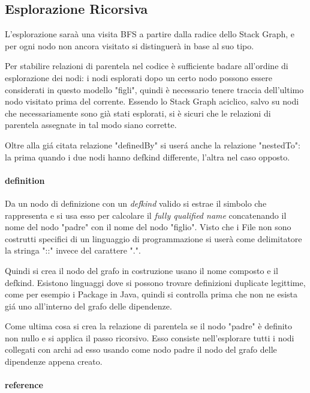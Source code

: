 \subsection{Esplorazione Ricorsiva}

L'esplorazione sara\`a una visita BFS a partire dalla radice dello Stack Graph, e per ogni nodo non ancora visitato si distinguer\`a in base al suo tipo.

Per stabilire relazioni di parentela nel codice \`e sufficiente badare all'ordine di esplorazione dei nodi: i nodi esplorati dopo un certo nodo possono essere considerati in questo modello "figli", quindi \`e necessario tenere traccia dell'ultimo nodo visitato prima del corrente. Essendo lo Stack Graph aciclico, salvo su nodi che necessariamente sono gi\`a stati esplorati, si \`e sicuri che le relazioni di parentela assegnate in tal modo siano corrette.

Oltre alla gi\'a citata relazione "definedBy" si user\'a anche la relazione "nestedTo": la prima quando i due nodi hanno defkind differente, l'altra nel caso opposto.

\paragraph{definition}

Da un nodo di definizione con un \emph{defkind} valido si estrae il simbolo che rappresenta e si usa esso per calcolare il \emph{fully qualified name} concatenando il nome del nodo "padre" con il nome del nodo "figlio". Visto che i File non sono costrutti specifici di un linguaggio di programmazione si user\`a come delimitatore la stringa "::" invece del carattere ".".

Quindi si crea il nodo del grafo in costruzione usano il nome composto e il defkind. Esistono linguaggi dove si possono trovare definizioni duplicate legittime, come per esempio i Package in Java, quindi si controlla prima che non ne esista gi\'a uno all'interno del grafo delle dipendenze.

Come ultima cosa si crea la relazione di parentela se il nodo "padre" \`e definito non nullo e si applica il passo ricorsivo.
Esso consiste nell'esplorare tutti i nodi collegati con archi ad esso usando come nodo padre il nodo del grafo delle dipendenze appena creato.

\paragraph{reference}

